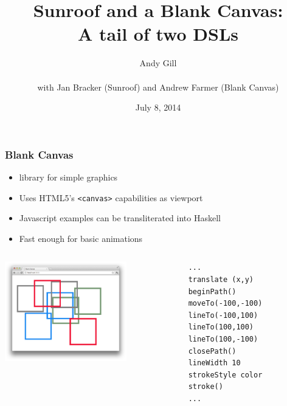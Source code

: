 \documentclass{beamer}
\title[JavaScript DSLs]{Sunroof and a Blank Canvas:\\A tail of two DSLs}
\author[Andy Gill]{Andy Gill\\~\\with Jan Bracker (Sunroof) and Andrew Farmer (Blank Canvas)}
\institute{University of Kansas}
\date{July 8, 2014}
\begin{document}
\frame{\titlepage}

\begin{frame}[fragile]
\frametitle{Blank Canvas}
\Large
\begin{itemize}
\item library for simple graphics
\item Uses HTML5's \verb|<canvas>| capabilities as viewport
\item Javascript examples can be transliterated into Haskell    
\item Fast enough for basic animations
\end{itemize}
\begin{columns}
\begin{column}{0.45\textwidth}
\includegraphics[width=150pt]{squares.png}
\end{column}
\begin{column}{0.55\textwidth}
\begin{codeblock}[0.6]
\footnotesize
\begin{verbatim}
...
translate (x,y)
beginPath()
moveTo(-100,-100)
lineTo(-100,100)
lineTo(100,100)
lineTo(100,-100)
closePath()
lineWidth 10
strokeStyle color
stroke()
...
\end{verbatim}
\end{codeblock}
\end{column}
\end{columns}


\end{frame}
\end{document}
